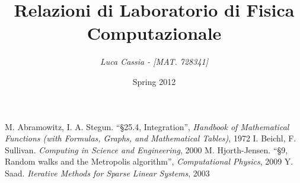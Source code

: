 \documentclass[a4paper,11pt]{report}
\title{\bfseries{\Huge{Relazioni di Laboratorio di Fisica Computazionale}}}
\author{\textit {Luca Cassia - [MAT. 728341]}}
\date{Spring 2012}
\begin{document}
\maketitle
\tableofcontents






\begin{thebibliography}{9}
 M. Abramowitz, I. A. Stegun. ``§25.4, Integration'', \textit{Handbook of Mathematical Functions (with Formulas, Graphs, and Mathematical Tables)}, 1972
 I. Beichl, F. Sullivan. \textit{Computing in Science and Engineering}, 2000
 M. Hjorth-Jensen. ``§9, Random walks and the Metropolis algorithm'', \textit{Computational Physics}, 2009
 Y. Saad. \textit{Iterative Methods for Sparse Linear Systems}, 2003
\end{thebibliography} 
\end{document}

